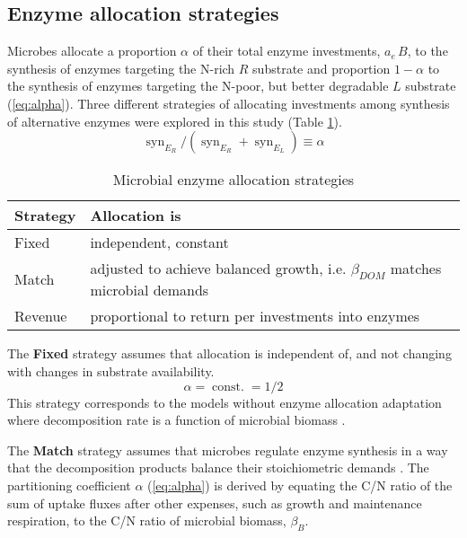 \subsection{ Enzyme allocation strategies} 
\label{sec:AllocStrategies}

Microbes allocate a proportion $\alpha$ of their total enzyme investments,
$a_e\,B$, to the synthesis of enzymes targeting the N-rich $R$ substrate and proportion $1
- \alpha$ to the synthesis of enzymes targeting the N-poor, but better
degradable $L$ substrate (\ref{eq:alpha}). Three different strategies of
allocating investments among synthesis of alternative enzymes were explored in this study (Table
\ref{tab:AllocStrategies}).
\begin{equation} 
\label{eq:alpha}
\operatorname{syn}_{E_R} /
(\operatorname{syn}_{E_R} + \operatorname{syn}_{E_L}) \equiv \alpha
\end{equation}

\begin{table}[t]
\caption{Microbial enzyme allocation strategies \label{tab:AllocStrategies}}
\vskip4mm
\centering
\begin{tabular}{lp{6.5cm}}
\hline
Strategy &  Allocation is \\
\hline
Fixed & independent, constant \\
Match & adjusted to achieve balanced growth, i.e. $\beta_{DOM}$ matches
microbial demands  \\
Revenue & proportional to return per investments into enzymes \\
\hline
\end{tabular}
\end{table}


The \textbf{Fixed} strategy assumes that allocation is independent of,
and not changing with changes in substrate availability.
\begin{equation} 
\label{eq:allocFixed}
\alpha = \operatorname{const.} = 1/2
\end{equation}
This strategy corresponds to the models without enzyme allocation adaptation
where decomposition rate is a function of microbial biomass \citep{Wutzler08}.
 
The \textbf{Match} strategy assumes that microbes regulate enzyme synthesis in a
way that the decomposition products balance their stoichiometric demands
\citep{Moorhead12}. The partitioning coefficient $\alpha$ (\ref{eq:alpha}) is
derived by equating the C/N ratio of the sum of uptake fluxes after
other expenses, such as growth and maintenance respiration, to the
C/N ratio of microbial biomass, $\beta_B$.

